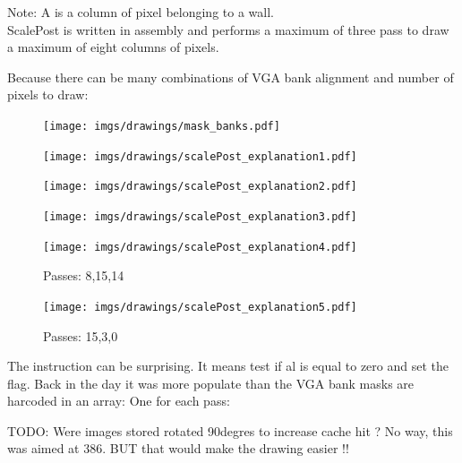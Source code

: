 Note: A  is a column of pixel belonging to a wall.\\
ScalePost is written in assembly and performs a maximum of three pass to draw a maximum of eight columns of pixels.\\
\par 
\begin{minipage}{\textwidth}

\end{minipage}
Because there can be many combinations of VGA bank alignment and number of pixels to draw:

\begin{figure}[H]
\centering
 \texttt{[image: imgs/drawings/mask\_banks.pdf]}
 \end{figure}



\begin{figure}[H]
\centering
 \texttt{[image: imgs/drawings/scalePost\_explanation1.pdf]}
 \end{figure}
 
 \begin{figure}[H]
 \centering
 \texttt{[image: imgs/drawings/scalePost\_explanation2.pdf]}
 \end{figure}

  \begin{figure}[H]
 \centering
 \texttt{[image: imgs/drawings/scalePost\_explanation3.pdf]}
 \end{figure}

  \begin{figure}[H]
 \centering
 \texttt{[image: imgs/drawings/scalePost\_explanation4.pdf]}
 \caption{Passes: 8,15,14}
 \end{figure}

   \begin{figure}[H]
 \centering
 \texttt{[image: imgs/drawings/scalePost\_explanation5.pdf]}
  \caption{Passes: 15,3,0}
 \end{figure}


The instruction  can be surprising. It means test if al is equal to zero and set the flag. Back in the day it was more populate than 
 the VGA bank masks are harcoded in an array: One for each pass:\\
 \par
 \begin{minipage}{\textwidth}

\end{minipage}
TODO: Were images stored rotated 90degres to increase cache hit ? No way, this was aimed at 386. BUT that would make the drawing easier !!

